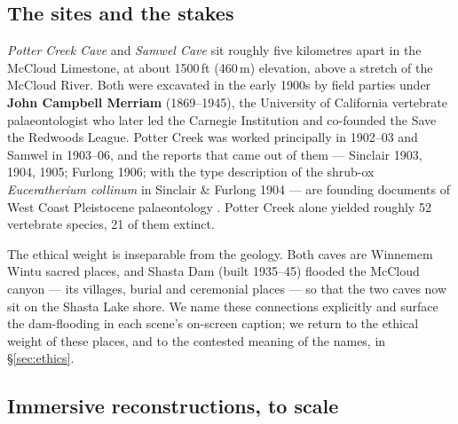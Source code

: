\documentclass[11pt]{article}
\begin{document}
\subsection{The sites and the stakes}

\emph{Potter Creek Cave} and \emph{Samwel Cave} sit roughly five kilometres apart in the McCloud Limestone, at about 1500\,ft (460\,m) elevation, above a stretch of the McCloud River. Both were excavated in the early 1900s by field parties under \textbf{John Campbell Merriam} (1869--1945), the University of California vertebrate palaeontologist who later led the Carnegie Institution and co-founded the Save the Redwoods League. Potter Creek was worked principally in 1902--03 and Samwel in 1903--06, and the reports that came out of them --- Sinclair 1903, 1904, 1905; Furlong 1906; with the type description of the shrub-ox \emph{Euceratherium collinum} in Sinclair \& Furlong 1904 --- are founding documents of West Coast Pleistocene palaeontology \cite{sinclair04,sinclair03,furlong06,sinclair05,sf04}. Potter Creek alone yielded roughly 52 vertebrate species, 21 of them extinct.

The ethical weight is inseparable from the geology. Both caves are Winnemem Wintu sacred places, and Shasta Dam (built 1935--45) flooded the McCloud canyon --- its villages, burial and ceremonial places --- so that the two caves now sit on the Shasta Lake shore. We name these connections explicitly and surface the dam-flooding in each scene's on-screen caption; we return to the ethical weight of these places, and to the contested meaning of the names, in \S\ref{sec:ethics}.

\subsection{Immersive reconstructions, to scale}
\end{document}
